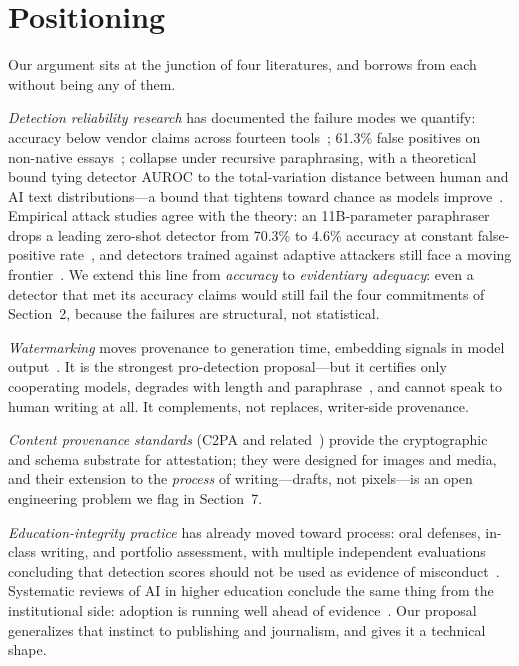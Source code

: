 \documentclass[sigconf,nonacm]{acmart}
\begin{document}
\section{Positioning}

Our argument sits at the junction of four literatures, and borrows from each without being any of them.

\emph{Detection reliability research} has documented the failure modes we quantify: accuracy below vendor claims across fourteen tools~\cite{r4}; 61.3\% false positives on non-native essays~\cite{r3}; collapse under recursive paraphrasing, with a theoretical bound tying detector AUROC to the total-variation distance between human and AI text distributions---a bound that tightens toward chance as models improve~\cite{r5}. Empirical attack studies agree with the theory: an 11B-parameter paraphraser drops a leading zero-shot detector from 70.3\% to 4.6\% accuracy at constant false-positive rate~\cite{r17}, and detectors trained against adaptive attackers still face a moving frontier~\cite{r18}. We extend this line from \emph{accuracy} to \emph{evidentiary adequacy}: even a detector that met its accuracy claims would still fail the four commitments of Section~2, because the failures are structural, not statistical.

\emph{Watermarking} moves provenance to generation time, embedding signals in model output~\cite{r6}. It is the strongest pro-detection proposal---but it certifies only cooperating models, degrades with length and paraphrase~\cite{r5}, and cannot speak to human writing at all. It complements, not replaces, writer-side provenance.

\emph{Content provenance standards} (C2PA and related~\cite{r10}) provide the cryptographic and schema substrate for attestation; they were designed for images and media, and their extension to the \emph{process} of writing---drafts, not pixels---is an open engineering problem we flag in Section~7.

\emph{Education-integrity practice} has already moved toward process: oral defenses, in-class writing, and portfolio assessment, with multiple independent evaluations concluding that detection scores should not be used as evidence of misconduct~\cite{r3,r4}. Systematic reviews of AI in higher education conclude the same thing from the institutional side: adoption is running well ahead of evidence~\cite{r19}. Our proposal generalizes that instinct to publishing and journalism, and gives it a technical shape.
\end{document}
